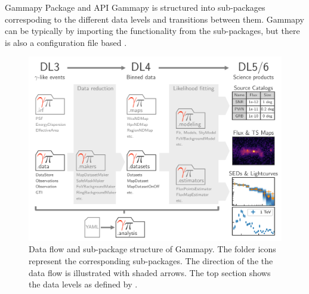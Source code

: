 \documentclass[
    final,
    ]{beamer}
\newlength{\colwidth}
\newcommand{\coloredhref}[3][blue]{\href{#2}{\color{#1}{#3}}}%
\begin{document}
\begin{frame}[t, fragile]
\begin{columns}[t]
\begin{column}{\colwidth}
  \begin{block}{Gammapy Package and API}
  Gammapy is structured into sub-packages correspoding to the different data levels and transitions between them. Gammapy can be typically \coloredhref[pink]{https://docs.gammapy.org/0.18.2/tutorials/analysis_2.html}{used as a standard Python library} by importing the functionality from the sub-packages, but there is also a configuration file based \coloredhref[pink]{https://docs.gammapy.org/0.18.2/tutorials/analysis_1.html}{high level analysis API}.
    \begin{figure}
      \centering
      \includegraphics[width=\textwidth]{figures/data-flow-gammapy.pdf}
      \caption{Data flow and sub-package structure of Gammapy. The folder icons represent the corresponding sub-packages. The direction of the the data flow is illustrated with shaded arrows. The top section shows the data levels as defined by \coloredhref[pink]{https://www.cta-observatory.org}{CTA}.}
    \end{figure}


  \end{block}




\end{column}
\end{columns}
\end{frame}
\end{document}
